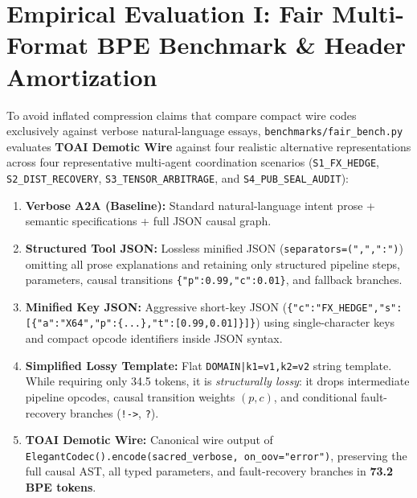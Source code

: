 \documentclass[9pt,a4paper]{extarticle}
\begin{document}
\section{Empirical Evaluation I: Fair Multi-Format BPE Benchmark \& Header Amortization}
To avoid inflated compression claims that compare compact wire codes exclusively against verbose natural-language essays, \texttt{benchmarks/fair\_bench.py} evaluates \textbf{TOAI Demotic Wire} against four realistic alternative representations across four representative multi-agent coordination scenarios (\texttt{S1\_FX\_HEDGE}, \texttt{S2\_DIST\_RECOVERY}, \texttt{S3\_TENSOR\_ARBITRAGE}, and \texttt{S4\_PUB\_SEAL\_AUDIT}):
\begin{enumerate}
  \item \textbf{Verbose A2A (Baseline):} Standard natural-language intent prose + semantic specifications + full JSON causal graph.
  \item \textbf{Structured Tool JSON:} Lossless minified JSON (\texttt{separators=(",",":")}) omitting all prose explanations and retaining only structured pipeline steps, parameters, causal transitions \texttt{\{"p":0.99,"c":0.01\}}, and fallback branches.
  \item \textbf{Minified Key JSON:} Aggressive short-key JSON (\texttt{\{"c":"FX\_HEDGE","s":[\{"a":"X64","p":\{...\},"t":[0.99,0.01]\}]\}}) using single-character keys and compact opcode identifiers inside JSON syntax.
  \item \textbf{Simplified Lossy Template:} Flat \texttt{DOMAIN|k1=v1,k2=v2} string template. While requiring only 34.5 tokens, it is \emph{structurally lossy}: it drops intermediate pipeline opcodes, causal transition weights $(p,c)$, and conditional fault-recovery branches (\texttt{!->}, \texttt{?}).
  \item \textbf{TOAI Demotic Wire:} Canonical wire output of \texttt{ElegantCodec().encode(sacred\_verbose, on\_oov="error")}, preserving the full causal AST, all typed parameters, and fault-recovery branches in \textbf{73.2 BPE tokens}.
\end{enumerate}
\end{document}
